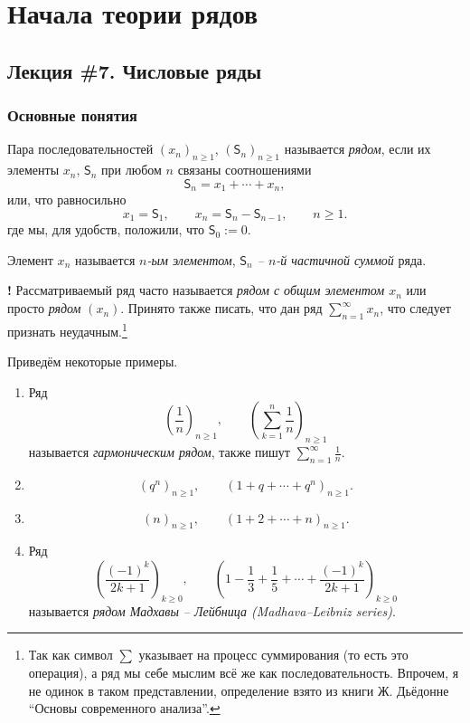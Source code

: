 \chapter{Начала теории рядов}

\section{Лекция \#7. Числовые ряды}

\subsection{Основные понятия}

\begin{definition}
    Пара последовательностей $(x_n)_{n \ge 1}$, $(\mathsf{S}_n)_{n \ge 1}$ называется \textit{рядом}, если их элементы $x_n$, $\mathsf{S}_n$ при любом $n$ связаны соотношениями
    \[
     \mathsf{S}_n = x_1 + \cdots + x_n,
    \]
    или, что равносильно
    \[
     x_1=\mathsf{S}_1, \qquad x_n = \mathsf{S}_n-\mathsf{S}_{n-1}, \qquad n\ge 1.
    \]
где мы, для удобств, положили, что $\mathsf{S}_0:=0$.

Элемент $x_n$ называется \textit{$n$-ым элементом}, \textit{$\mathsf{S}_n$ -- $n$-й частичной суммой} ряда. 

\begin{mydanger}{\bf !}
 Рассматриваемый ряд часто называется \textit{рядом с общим элементом $x_n$} или просто \textit{рядом} $(x_n)$. Принято также писать, что дан ряд $\sum_{n=1}^\infty x_n$, что следует признать неудачным.\footnote{Так как символ $\sum$ указывает на процесс суммирования (то есть это операция), а ряд мы себе мыслим всё же как последовательность. Впрочем, я не одинок в таком представлении, определение взято из книги Ж. Дьёдонне ``Основы современного анализа''.}
\end{mydanger}
\end{definition}

\begin{example} Приведём некоторые примеры.
    \begin{enumerate}
        \item Ряд
        \[
         \left(\frac{1}{n} \right)_{n\ge 1}, \qquad \left(\sum_{k=1}^n \frac{1}{n} \right)_{n\ge 1}
        \]
        называется \textit{гармоническим рядом}, также пишут $\sum_{n=1}^\infty \frac{1}{n}.$
        \item
        \[
        (q^n)_{n\ge 1},\qquad (1+q+\cdots +q^n)_{n\ge 1}.
        \]
        \item
        \[
         (n)_{n \ge 1}, \qquad \left(1+2+\cdots + n \right)_{n \ge 1}.
        \]
        
        \item Ряд 
        \[
         \left(\frac{(-1)^k}{2k+1}\right)_{k \ge 0}, \qquad \left(1-\frac{1}{3} + \frac{1}{5} + \cdots + \frac{(-1)^k}{2k+1}\right)_{k\ge 0} 
        \]
       называется \textit{рядом Мадхавы -- Лейбница (Madhava--Leibniz series)}. 
        \end{enumerate}    
\end{example}




